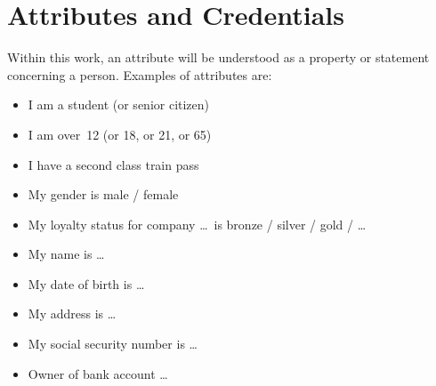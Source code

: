 


\section{Attributes and Credentials}

Within this work, an attribute will be understood as a
property or statement concerning a person. Examples of attributes are:
\begin{multicols}{2}
\begin{itemize}
  \item I am a \textsf{student} (or \textsf{senior citizen})
  \item I am \textsf{over~12} (or \textsf{18}, or \textsf{21}, or \textsf{65})
  \item I have a \textsf{second class train pass}
  \item My \textsf{gender} is \textsf{male / female}
  \item My \textsf{loyalty status} for company \dots\ is \textsf{bronze / silver / gold / \dots}
  \item My \textsf{name} is \dots
  \item My \textsf{date of birth} is \dots
  \item My \textsf{address} is \dots
  \item My \textsf{social security number} is \dots
  \item Owner of \textsf{bank account} \dots
\end{itemize}
\end{multicols}

